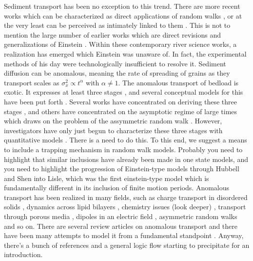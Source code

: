 \documentclass[]{agujournal2018}
\begin{document}
Sediment transport has been no exception to this trend. There are more recent works which can be characterized as direct applications of random walks \citep{Lisle1998}, or at the very least can be perceived as intimately linked to them \citep{Zhang2012, Ancey2014,Wu2019}.
This is not to mention the large number of earlier works which are direct revisions and generalizations of Einstein \citep{Yang1971,Gordon1972,Hubbell1964,Sayre1965,Nakagawa1976,Nakagawa1980,Yano1969,Shen1980}.
Within these contemporary river science works, a realization has emerged which Einstein was unaware of. In fact, the experimental methods of his day were technologically insufficient to resolve it. Sediment diffusion can be anomalous, meaning the rate of spreading of grains as they transport scales as $\sigma_x^2 \propto t^\alpha$ with $\alpha\neq1$.
The anomalous transport of bedload is exotic. 
It expresses at least three stages \citep{Nikora2001a}, and several conceptual models for this have been put forth \citep{Nikora2002, Martin2012}. Several works have concentrated on deriving these three stages \citep[e.g.][]{Fan2016,Zhang2012}, and others have concentrated on the asymptotic regime of large times \citep{Bradley2017,Hassan2017} which draws on the problem of the assymmetric random walk \citep[e.g.][]{Weeks1996,Weeks1998}.
However, investigators have only just begun to characterize these three stages with quantitative models \citep[e.g.][]{Wu2019}.
There is a need to do this.
To this end, we suggest a means to include a trapping mechanism in random walk models.
Probably you need to highlight that similar inclusions have already been made in one state models, and you need to highlight the progression of Einstein-type models through Hubbell and Shen into Lisle, which was the first einstein-type model which is fundamentally different in its inclusion of finite motion periods.
Anomalous transport has been realized in many fields, such as charge transport in disordered solids \citep[e.g.][]{Scher1973}, dynamics across lipid bilayers \citep{Jeon2012,Molina-Garcia2018}, chemistry issues (look deeper) \citep{Metzler2014}, transport through porous media \citep{AaraoReis2014,Yang2019}, dipoles in an electric field \citep{Jordanovic2011}, asymmetric random walks \citep{Weeks1996,Weeks1998} and so on. There are several review articles on anomalous transport \citep{Klafter2005,Klages2008,Sokolov2012} and there have been many attempts to model it from a fundamental standpoint \citep{Gorenflo2008,Pottier2003,Fedotov2015,Flekkøy2017}.
Anyway, there's a bunch of references and a general logic flow starting to precipitate for an introduction.
\end{document}
